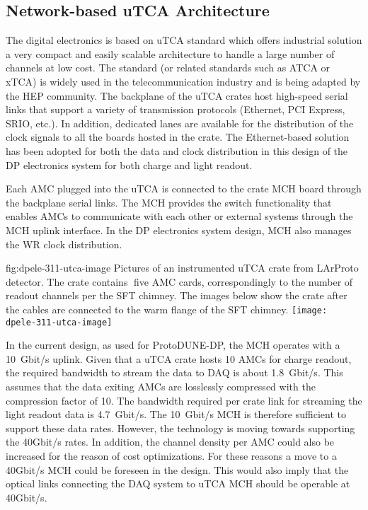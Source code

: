 \subsection{Network-based uTCA Architecture}
\label{sec:fddp-tpc-elec-design-utca}

The digital electronics is based on uTCA standard which offers industrial solution a very compact and easily scalable architecture to handle a large number of channels at low cost.  The standard (or related standards such as ATCA or xTCA) is widely used in the telecommunication industry and is being adapted by the HEP community. The backplane of the uTCA crates host high-speed serial links that support a variety of transmission protocols (Ethernet, PCI Express, SRIO, etc.). In addition, dedicated lanes are available for the distribution of the clock signals to all the boards hosted in the crate.  The Ethernet-based solution has been adopted for both the data and clock distribution in this design of the DP electronics system for both charge and light readout. 

Each AMC plugged into the uTCA is connected to the crate MCH board through the backplane serial links. The MCH provides the switch functionality that enables AMCs to communicate with each other or external systems through the MCH uplink interface. In the DP electronics system design, MCH also manages the WR clock distribution. 

\begin{dunefigure}{fig:dpele-311-utca-image}
{Pictures of an instrumented uTCA crate from LArProto detector. The crate contains five AMC cards, correspondingly to the number of readout channels per the SFT chimney. The images below show the crate after the  cables are connected to the warm flange of the SFT chimney.}
\texttt{[image: dpele-311-utca-image]}
\end{dunefigure}

In the current design, as used for ProtoDUNE-DP, the MCH operates with a \SI{10}{Gbit/s} uplink. Given that a uTCA crate hosts \num{10} AMCs for charge readout, the required bandwidth to stream the data to DAQ is about \SI{1.8}{Gbit/s}. This assumes that the data exiting AMCs are losslessly compressed with the compression factor of \num{10}. The bandwidth required per crate link for streaming the light readout data is \SI{4.7}{Gbit/s}. The \SI{10}{Gbit/s} MCH is therefore sufficient to support these data rates. However, the technology is moving towards supporting the \num{40}{Gbit/s} rates. In addition, the channel density per AMC could also be increased for the reason of cost optimizations. For these reasons a move to a \num{40}{Gbit/s} MCH could be foreseen in the design. This would also imply that the optical links connecting the DAQ system to uTCA MCH should be operable at \num{40}{Gbit/s}.  

